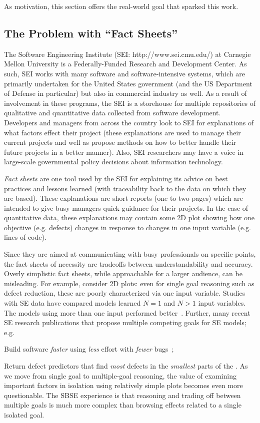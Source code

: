 
As motivation, this section  offers the real-world goal that
sparked this work.  
\subsection{The Problem with ``Fact Sheets''}
The Software Engineering
Institute (SEI: http://www.sei.cmu.edu/) at Carnegie
Mellon University is a Federally-Funded Research and
Development Center. As such, SEI works with many
software and software-intensive systems, which are
primarily undertaken for the United States
government (and the US Department of Defense in
particular) but also in commercial industry as
well. As a result of involvement in these programs,
the SEI is a storehouse for multiple repositories of
qualitative and quantitative data collected from
software development.
Developers and managers from across the country look
to SEI for explanations of what factors effect their
project (these explanations are used to manage their
current projects and well as propose methods on how
to better handle their future projects in a better
manner).  Also, SEI researchers may have a
voice in large-scale governmental policy decisions about
information technology.

 
{\em Fact sheets} are one tool used by the SEI for explaining its advice
on best practices and lessons learned
(with
traceability back to the data on which they are
based).  These
explanations are short reports (one to two pages)  which are intended
to give busy managers quick guidance for their
projects. In the case of quantitative data, these
explanations may contain some 2D plot showing how
one objective (e.g. defects) changes in response to
changes in one input variable (e.g. lines of code).

 
Since they are aimed at communicating with busy
professionals on specific points, the fact sheets of
necessity are tradeoffs  between
understandability and accuracy. 
Overly simplistic fact sheets,
while approachable for a larger audience,
can be misleading.  For example, consider  2D plots:
even for single goal
reasoning such as defect reduction, these are
poorly characterized via one input variable. Studies with SE
data have compared models learned  $N =
1$  and $N > 1$ input variables. The models using
more than one input performed better~\cite{me07b}.
Further, many recent SE research publications that propose multiple competing
goals for SE models; e.g.
\bi
\item
Build software {\em faster} using {\em less} effort with {\em fewer} bugs~\cite{elrawas10};
\item
Return defect predictors that find {\em most} defects in the {\em smallest} parts of the 
\cite{arisholm6}.
\ei
As we move from single goal to multiple-goal reasoning, the value of examining important factors in isolation using relatively simple plots
becomes even more questionable. The SBSE experience is that reasoning and
trading off between multiple goals is much more complex than browsing effects related
to a single isolated goal.

